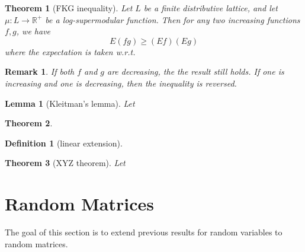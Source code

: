 \documentclass{article}
\newtheorem{Thm}{Theorem}[section]
\newtheorem{Lem}{Lemma}[section]
\newtheorem*{Rk}{Remark}
\theoremstyle{definition}
\newtheorem{Def}{Definition}[section]
\begin{document}
\begin{Thm}[FKG inequality]
    Let $L$ be a finite distributive lattice, and let $\mu:L\to \mathbb{R}^+$ be a log-supermodular function.
    Then for any two increasing functions $f,g$, we have
    \[E(fg)\ge (Ef) (Eg)\] where the expectation is taken w.r.t. 
\end{Thm}
\begin{Rk}
    If both $f$ and $g$ are decreasing, the the result still holds. If one is increasing and one is decreasing, then the inequality is reversed.
\end{Rk}

\begin{Lem}[Kleitman's lemma]
    Let 
\end{Lem}

\begin{Thm}
    
\end{Thm}

\begin{Def}[linear extension]
    
\end{Def}

\begin{Thm}[XYZ theorem]
    Let 
\end{Thm}


\section{Random Matrices}
The goal of this section is to extend previous results for random variables to random matrices.
\end{document}
